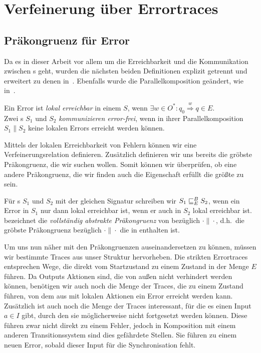 \chapter{Verfeinerung über Errortraces}

\section{Präkongruenz für Error}

Da es in dieser Arbeit vor allem um die Erreichbarkeit und die Kommunikation
zwischen \EIO{}s geht, wurden die nächsten beiden Definitionen explizit getrennt
und erweitert zu denen in~\cite{Vogler2014EIO}. Ebenfalls wurde die
Parallelkomposition geändert, wie in~\cite{Schlosser2012BA}.

\begin{Def}
  Ein Error ist \emph{lokal erreichbar} in einem \EIO{} $S$, wenn $\exists w\in O^*: q_0
  \overset{w}{\Rightarrow} q\in E$.\\
  Zwei \EIO{}s $S_1$ und $S_2$ \emph{kommunizieren error-frei}, wenn in ihrer
  Parallelkomposition $S_1\| S_2$ keine lokalen Errors erreicht werden können.
\end{Def}

Mittels der lokalen Erreichbarkeit von Fehlern können wir eine
Verfeinerungsrelation definieren. Zusätzlich definieren wir uns bereits die
gröbste Präkongruenz, die wir suchen wollen. Somit können wir überprüfen, ob
eine andere Präkongruenz, die wir finden auch die Eigenschaft erfüllt die
größte zu sein.

\begin{Def}
  Für \EIO{}s $S_1$ und $S_2$ mit der gleichen Signatur schreiben wir
  $S_1\sqsubseteq _E^B S_2$, wenn ein Error in $S_1$ nur dann lokal erreichbar ist, wenn er
  auch in $S_2$ lokal erreichbar ist.\\
  \ECRel{} bezeichnet die \emph{vollständig abstrakte Präkongruenz} von \EBRel{}
  bezüglich $\cdot\|\cdot$, d.h.\ die gröbste Präkongruenz bezüglich
  $\cdot\|\cdot$ die in \EBRel{} enthalten ist.
\end{Def}

Um uns nun näher mit den Präkongruenzen auseinandersetzen zu können, müssen wir bestimmte Traces
aus unser Struktur hervorheben. Die strikten Errortraces entsprechen Wege, die
direkt vom Startzustand zu einem Zustand in der Menge $E$ führen. Da Outputs Aktionen
sind, die von außen nicht verhindert werden können, benötigen wir auch noch die
Menge der Traces, die zu einem Zustand führen, von dem aus mit lokalen Aktionen
ein Error erreicht werden kann. Zusätzlich ist auch noch die Menge der Traces
interessant, für die es einen Input $a\in I$ gibt, durch den sie möglicherweise nicht
fortgesetzt werden können. Diese führen zwar nicht
direkt zu einem Fehler, jedoch in Komposition mit einem anderen
Transitionssystem sind
dies gefährdete Stellen. Sie führen zu einem neuen Error, sobald dieser Input
für die Synchronisation fehlt.

